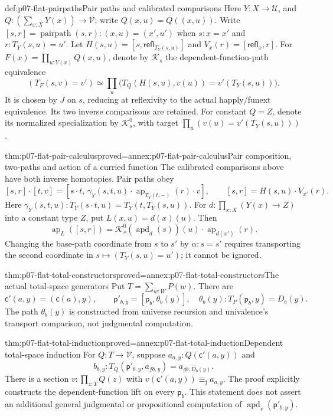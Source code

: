 \begin{hbconvention}{def:p07-flat-pairpaths}{Pair paths and calibrated comparisons}
Here \(Y:X\to\mathcal U\), and
\(Q:(\sum_{x:X}Y(x))\to\mathcal V\);
write \(Q(x,u)=Q((x,u))\).
Write \([s,r]=\operatorname{pairpath}(s,r):(x,u)=(x',u')\)
when \(s:x=x'\) and \(r:T_Y(s,u)=u'\).
Let \(H(s,u)=[s,\mathsf{refl}_{T_Y(s,u)}]\) and
\(V_x(r)=[\mathsf{refl}_x,r]\).
For \(F(x)=\prod_{u:Y(x)}Q(x,u)\), denote by \(\mathcal K_s\) the
dependent-function-path equivalence
\[
(T_F(s,v)=v')\simeq
\prod_u\bigl(T_Q(H(s,u),v(u))=v'(T_Y(s,u))\bigr).
\]
It is chosen by \(J\) on \(s\), reducing at reflexivity to the actual
happly/funext equivalence. Its two inverse comparisons are retained.
For constant \(Q=Z\), denote its normalized specialization by
\(\mathcal K^0_s\), with target
\(\prod_u(v(u)=v'(T_Y(s,u)))\).
\end{hbconvention}

\begin{hblemma}{thm:p07-flat-pair-calculus}{proved=annex:p07-flat-pair-calculus}{Pair composition, two-paths and action of a curried function}
The calibrated comparisons above have both inverse homotopies.
Pair paths obey
\[
[s,r]\cdot[t,v]
 =[s\cdot t,\,
   \gamma_Y(s,t,u)\cdot
   \operatorname{ap}_{T_Y(t,-)}(r)\cdot v],
\qquad [s,r]=H(s,u)\cdot V_{x'}(r).
\]
Here \(\gamma_Y(s,t,u):T_Y(s\cdot t,u)=T_Y(t,T_Y(s,u))\).
For \(d:\prod_{x:X}(Y(x)\to Z)\) into a constant type \(Z\),
put \(L(x,u)=d(x)(u)\). Then
\[
\operatorname{ap}_L([s,r])
 =\mathcal K^0_s(\operatorname{apd}_d(s))(u)
       \cdot\operatorname{ap}_{d(x')}(r).
\]
Changing the base-path coordinate from \(s\) to \(s'\) by
\(\alpha:s=s'\) requires transporting the second coordinate in
\(s\mapsto(T_Y(s,u)=u')\); it cannot be ignored.
\end{hblemma}

\begin{hblemma}{thm:p07-flat-total-constructors}{proved=annex:p07-flat-total-constructors}{The actual total-space generators}
Put \(T=\sum_{w:W}P(w)\). There are
\[
\mathsf c'(a,y)=(\mathsf c(a),y),\qquad
\mathsf p'_{b,y}=[\mathsf p_b,\theta_b(y)],
\quad
\theta_b(y):T_P(\mathsf p_b,y)=D_b(y).
\]
The path \(\theta_b(y)\) is constructed from universe recursion and
univalence's transport comparison, not judgmental computation.
\end{hblemma}

\begin{hblemma}{thm:p07-flat-total-induction}{proved=annex:p07-flat-total-induction}{Dependent total-space induction}
For \(Q:T\to\mathcal V\), suppose
\(a_{a,y}:Q(\mathsf c'(a,y))\) and
\[
b_{b,y}:T_Q(\mathsf p'_{b,y},a_{fb,y})
                       =a_{gb,D_b(y)}.
\]
There is a section \(v:\prod_{z:T}Q(z)\) with
\(v(\mathsf c'(a,y))\equiv_{\mathrm j}a_{a,y}\).
The proof explicitly constructs the dependent-function lift on every
\(\mathsf p_b\). This statement does not assert an additional general
judgmental or propositional computation of
\(\operatorname{apd}_v(\mathsf p'_{b,y})\).
\end{hblemma}

